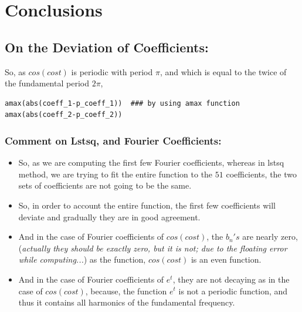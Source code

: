\documentclass[10pt,english, openany]{book}
\begin{document}
\chapter{Conclusions}
\section{On the Deviation of Coefficients:}
So,  as $cos(cost)$ is periodic with period $\pi$, and which is equal to the twice of the fundamental period $2\pi$, 

\begin{verbatim}
amax(abs(coeff_1-p_coeff_1))  ### by using amax function
amax(abs(coeff_2-p_coeff_2))
\end{verbatim}
\subsection{Comment on Lstsq, and Fourier Coefficients:}
\begin{itemize}
\item So, as we are computing the first few Fourier coefficients, whereas in lstsq method, we are trying to fit the entire function to the $51$ coefficients, the two sets of coefficients are not going to be the same.
\end{itemize}

\begin{itemize}
\item So, in order to account the entire function, the first few coefficients will deviate and gradually they are in good agreement.
\end{itemize}

\begin{itemize}
\item And in the case of Fourier coefficients of $cos(cost)$, the $b_n's$ are nearly zero, (\textit{actually they should be exactly zero, but it is not; due to the floating error while computing...}) as the function, $cos(cost)$ is an even function.
\end{itemize}

\begin{itemize}
\item And in the case of Fourier coefficients of $e^t$, they are not decaying as in the case of $cos(cost)$, because, the function $e^t$ is not a periodic function, and thus it contains all harmonics of the fundamental frequency.
\end{itemize}




\end{document}

